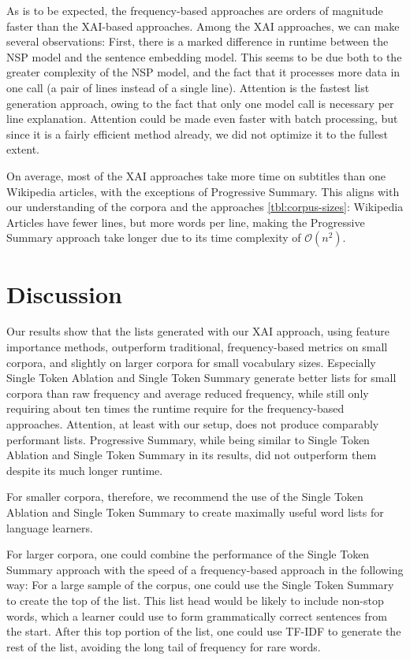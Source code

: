 As is to be expected, the frequency-based approaches are orders of magnitude faster than the XAI-based approaches.
Among the XAI approaches, we can make several observations:
First, there is a marked difference in runtime between the NSP model and the sentence embedding model.
This seems to be due both to the greater complexity of the NSP model, and the fact that it processes more data in one call (a pair of lines instead of a single line).
Attention is the fastest list generation approach, owing to the fact that only one model call is necessary per line explanation.
Attention could be made even faster with batch processing, but since it is a fairly efficient method already, we did not optimize it to the fullest extent.

On average, most of the XAI approaches take more time on subtitles than one Wikipedia articles, with the exceptions of Progressive Summary.
This aligns with our understanding of the corpora and the approaches \ref{tbl:corpus-sizes}:
Wikipedia Articles have fewer lines, but more words per line, making the Progressive Summary approach take longer due to its time complexity of $\mathcal{O}(n^2)$.


\section{Discussion}
Our results show that the lists generated with our XAI approach, using feature importance methods, outperform traditional, frequency-based metrics on small corpora, and slightly on larger corpora for small vocabulary sizes.
Especially Single Token Ablation and Single Token Summary generate better lists for small corpora than raw frequency and average reduced frequency, while still only requiring about ten times the runtime require for the frequency-based approaches.
Attention, at least with our setup, does not produce comparably performant lists.
Progressive Summary, while being similar to Single Token Ablation and Single Token Summary in its results, did not outperform them despite its much longer runtime.

For smaller corpora, therefore, we recommend the use of the Single Token Ablation and Single Token Summary to create maximally useful word lists for language learners.

For larger corpora, one could combine the performance of the Single Token Summary approach with the speed of a frequency-based approach in the following way:
For a large sample of the corpus, one could use the Single Token Summary to create the top of the list.
This list head would be likely to include non-stop words, which a learner could use to form grammatically correct sentences from the start.
After this top portion of the list, one could use TF-IDF to generate the rest of the list, avoiding the long tail of frequency for rare words.







